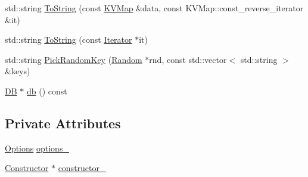 \begin{DoxyCompactItemize}
\item 
std\-::string \hyperlink{classleveldb_1_1_harness_a7589308a4592b9edb4142825b743244c}{To\-String} (const \hyperlink{namespaceleveldb_aac1e50450147be263e08252c6700f7a7}{K\-V\-Map} \&data, const K\-V\-Map\-::const\-\_\-reverse\-\_\-iterator \&it)
\item 
std\-::string \hyperlink{classleveldb_1_1_harness_a1cdf351918a2e969bce1c29290317403}{To\-String} (const \hyperlink{classleveldb_1_1_iterator}{Iterator} $\ast$it)
\item 
std\-::string \hyperlink{classleveldb_1_1_harness_ab6f2d80f97eb56fc65d4a9177cd86c03}{Pick\-Random\-Key} (\hyperlink{classleveldb_1_1_random}{Random} $\ast$rnd, const std\-::vector$<$ std\-::string $>$ \&keys)
\item 
\hyperlink{classleveldb_1_1_d_b}{D\-B} $\ast$ \hyperlink{classleveldb_1_1_harness_ac278dc1cfc6a3b9f6ebc5ac93ccb42a7}{db} () const 
\end{DoxyCompactItemize}
\subsection*{Private Attributes}
\begin{DoxyCompactItemize}
\item 
\hyperlink{structleveldb_1_1_options}{Options} \hyperlink{classleveldb_1_1_harness_a503838bed7ecbdec2d06f577e54f522c}{options\-\_\-}
\item 
\hyperlink{classleveldb_1_1_constructor}{Constructor} $\ast$ \hyperlink{classleveldb_1_1_harness_a04b2410b1da9c47dd78240702e68c826}{constructor\-\_\-}
\end{DoxyCompactItemize}


